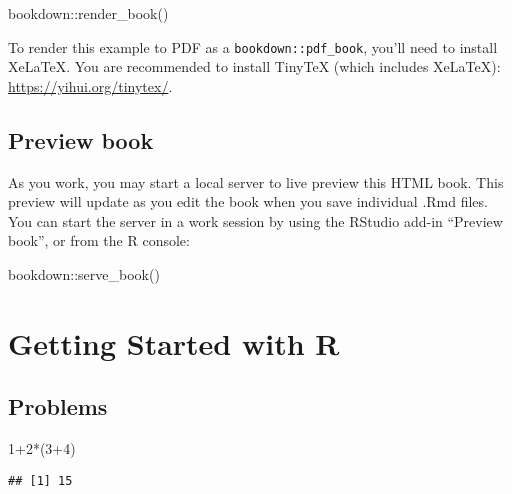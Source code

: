 \documentclass[
]{book}
\newenvironment{Shaded}{\begin{snugshade}}{\end{snugshade}}
\newcommand{\DecValTok}[1]{\textcolor[rgb]{0.00,0.00,0.81}{#1}}
\newcommand{\FunctionTok}[1]{\textcolor[rgb]{0.00,0.00,0.00}{#1}}
\newcommand{\NormalTok}[1]{#1}
\newcommand{\SpecialCharTok}[1]{\textcolor[rgb]{0.00,0.00,0.00}{#1}}
\theoremstyle{definition}
\theoremstyle{definition}
\theoremstyle{definition}
\theoremstyle{definition}
\theoremstyle{remark}
\begin{document}
\begin{Shaded}
\begin{Highlighting}[]
\NormalTok{bookdown}\SpecialCharTok{::}\FunctionTok{render\_book}\NormalTok{()}
\end{Highlighting}
\end{Shaded}

To render this example to PDF as a \texttt{bookdown::pdf\_book}, you'll need to install XeLaTeX. You are recommended to install TinyTeX (which includes XeLaTeX): \url{https://yihui.org/tinytex/}.

\hypertarget{preview-book}{%
\section*{Preview book}\label{preview-book}}

As you work, you may start a local server to live preview this HTML book. This preview will update as you edit the book when you save individual .Rmd files. You can start the server in a work session by using the RStudio add-in ``Preview book'', or from the R console:

\begin{Shaded}
\begin{Highlighting}[]
\NormalTok{bookdown}\SpecialCharTok{::}\FunctionTok{serve\_book}\NormalTok{()}
\end{Highlighting}
\end{Shaded}

\hypertarget{getting-started-with-r}{%
\chapter{Getting Started with R}\label{getting-started-with-r}}

\hypertarget{problems}{%
\section{Problems}\label{problems}}

\begin{Shaded}
\begin{Highlighting}[]
\DecValTok{1}\SpecialCharTok{+}\DecValTok{2}\SpecialCharTok{*}\NormalTok{(}\DecValTok{3}\SpecialCharTok{+}\DecValTok{4}\NormalTok{)}
\end{Highlighting}
\end{Shaded}

\begin{verbatim}
## [1] 15
\end{verbatim}
\end{document}
